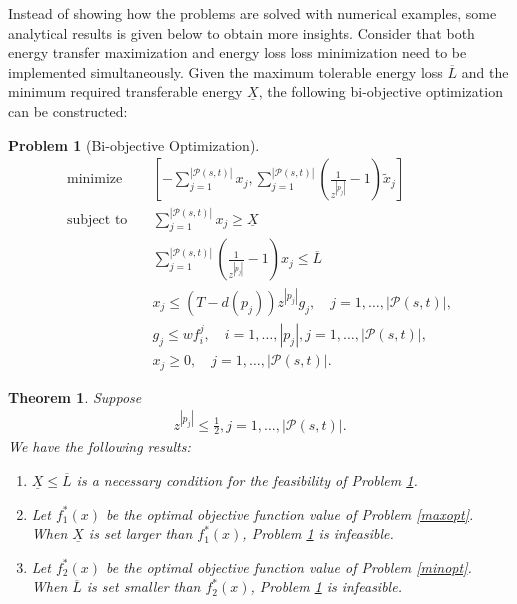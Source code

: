 \documentclass[journal]{IEEEtran}
\newtheorem{theorem}{\textbf{Theorem}}
\newtheorem{problem}{Problem}
\begin{document}
Instead of showing how the problems are solved with numerical examples, some analytical results is given below to obtain more insights.
Consider that both energy transfer maximization and energy loss loss minimization need to be implemented simultaneously. Given the maximum tolerable energy loss $\overline{L}$ and the minimum required transferable energy $\underline{X}$, the following bi-objective optimization can be constructed:
\begin{problem}[Bi-objective Optimization]
\label{ob-obj}
\begin{subequations}
\label{biopt}
\begin{align}
\text{minimize}\quad 	& [-\sum_{j=1}^{|\mathcal{P}(s,t)|}{x_j},\sum_{j=1}^{|\mathcal{P}(s,t)|}{(\frac{1}{z^{|p_j|}}-1)\tilde{x}_j}] \label{bi_obj}\\
\text{subject to}\quad 
& \sum_{j=1}^{|\mathcal{P}(s,t)|}{x_j} \geq \underline{X}  \label{bi_a}\\
& \sum_{j=1}^{|\mathcal{P}(s,t)|}{(\frac{1}{z^{|p_j|}}-1)   x_j} \leq \overline{L} \label{bi_d}\\
& x_j\leq (T-d(p_j))z^{|p_j|}g_j, \quad j=1,\ldots, |\mathcal{P}(s,t)|, \label{bi_b}\\
& g_j \leq w f_i^j, \quad i=1,\ldots,|p_j|, j=1,\ldots, |\mathcal{P}(s,t)|, \label{bi_c}\\
& x_j\geq 0, \quad j=1,\ldots, |\mathcal{P}(s,t)| \label{bie}.
\end{align}
\end{subequations}
\end{problem}


\begin{theorem} \label{thm:XL}
Suppose
\begin{align} 
z^{|p_j|}\leq \frac{1}{2}, j=1,\ldots, |\mathcal{P}(s,t)|. \label{thmCondition}
\end{align}
We have the following results:
\begin{enumerate}
	\item $\underline{X}\leq\overline{L}$ is a necessary condition for the feasibility of Problem \ref{ob-obj}.
	\item Let $f_1^*(x)$ be the optimal objective function value of Problem \ref{maxopt}. When $\underline{X}$ is set larger than $f_1^*(x)$, Problem \ref{ob-obj} is infeasible.
	\item Let $f_2^*(x)$ be the optimal objective function value of Problem \ref{minopt}. When $\overline{L}$ is set smaller than $f_2^*(x)$, Problem \ref{ob-obj} is infeasible.
\end{enumerate}
\end{theorem}
\end{document}
